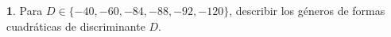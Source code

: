 \theoremstyle{definition}
\newtheorem{ejerGenerosB}{\ejername}[section]


\begin{ejerGenerosB}\label{ejer:generos:b}
	Para $D\in\{-40,-60,-84,-88,-92,-120\}$, describir los g\'eneros
	de formas cuadr\'aticas de discriminante $D$.%
\end{ejerGenerosB}

